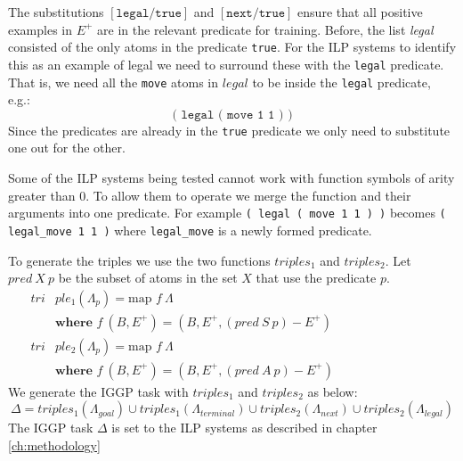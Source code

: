 The substitutions $[\texttt{legal}/\texttt{true}]$ and $[\texttt{next}/\texttt{true}]$ ensure that all positive examples in $E^+$ are in the relevant predicate for training. Before, the list \textit{legal} consisted of the only atoms in the predicate \texttt{true}. For the ILP systems to identify this as an example of legal we need to surround these with the \texttt{legal} predicate. That is, we need all the \texttt{move} atoms in $legal$ to be inside the \texttt{legal} predicate, e.g.:
\[\texttt{( legal ( move 1 1 ) )}\]
Since the predicates are already in the \texttt{true} predicate we only need to substitute one out for the other.

Some of the ILP systems being tested cannot work with function symbols of arity greater than 0. To allow them to operate we merge the function and their arguments into one predicate. For example \texttt{( legal ( move 1 1 ) )} becomes \verb|( legal_move 1 1 )| where \verb|legal_move| is a newly formed predicate.

To generate the triples we use the two functions $triples_1$ and $triples_2$. Let $pred\ X\ p$ be the subset of atoms in the set $X$ that use the predicate $p$.
\begin{align*}
tri&ple_1(\Lambda_p) = \text{map } f\ \Lambda\\
&\textbf{where } f\ (B,E^+) = (B,E^+,(pred\ S\ p) - E^+) \ \ \ \ \ \ \ \ \ \ \ \ \ \ \ \ \ \ \ \ \ \ \ \ \ \ \ \ \ \ \ \ \ \ \ \ \ \\
tri&ple_2(\Lambda_p) = \text{map } f\ \Lambda \\
&\textbf{where } f\ (B,E^+) = (B,E^+,(pred\ A\ p) - E^+)
\end{align*}
We generate the IGGP task with $triples_1$ and $triples_2$ as below:
\[\Delta = triples_1(\Lambda_{goal}) \cup triples_1(\Lambda_{terminal}) \cup triples_2(\Lambda_{next}) \cup triples_2(\Lambda_{legal})\]
The IGGP task $\Delta$ is set to the ILP systems as described in chapter \ref{ch:methodology}
